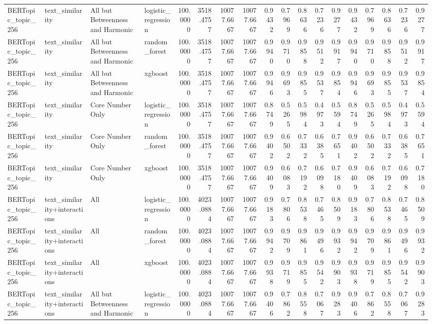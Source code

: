 \begin{tabular}{llllrrrrrrrrrrrrrr}
BERTopic_topic_256 & text_similarity & All but Betweenness and Harmonic & logistic_regression & 100.0000 & 3518.4757 & 10077.6667 & 10077.6667 & 0.9432 & 0.7969 & 0.8636 & 0.7236 & 0.9277 & 0.9432 & 0.7969 & 0.8636 & 0.7236 & 0.9277 \\
BERTopic_topic_256 & text_similarity & All but Betweenness and Harmonic & random_forest & 100.0000 & 3518.4757 & 10077.6667 & 10077.6667 & 0.9940 & 0.9710 & 0.9858 & 0.9512 & 0.9917 & 0.9940 & 0.9710 & 0.9858 & 0.9512 & 0.9917 \\
BERTopic_topic_256 & text_similarity & All but Betweenness and Harmonic & xgboost & 100.0000 & 3518.4757 & 10077.6667 & 10077.6667 & 0.9946 & 0.9693 & 0.9855 & 0.9537 & 0.9854 & 0.9946 & 0.9693 & 0.9855 & 0.9537 & 0.9854 \\
BERTopic_topic_256 & text_similarity & Core Number Only & logistic_regression & 100.0000 & 3518.4757 & 10077.6667 & 10077.6667 & 0.8749 & 0.5265 & 0.5984 & 0.4973 & 0.5594 & 0.8749 & 0.5265 & 0.5984 & 0.4973 & 0.5594 \\
BERTopic_topic_256 & text_similarity & Core Number Only & random_forest & 100.0000 & 3518.4757 & 10077.6667 & 10077.6667 & 0.9402 & 0.6502 & 0.7332 & 0.6385 & 0.7651 & 0.9402 & 0.6502 & 0.7332 & 0.6385 & 0.7651 \\
BERTopic_topic_256 & text_similarity & Core Number Only & xgboost & 100.0000 & 3518.4757 & 10077.6667 & 10077.6667 & 0.9409 & 0.6083 & 0.7192 & 0.6098 & 0.7180 & 0.9409 & 0.6083 & 0.7192 & 0.6098 & 0.7180 \\
BERTopic_topic_256 & text_similarity+interactions & All & logistic_regression & 100.0000 & 4023.0884 & 10077.6667 & 10077.6667 & 0.9183 & 0.7806 & 0.8538 & 0.7465 & 0.8509 & 0.9183 & 0.7806 & 0.8538 & 0.7465 & 0.8509 \\
BERTopic_topic_256 & text_similarity+interactions & All & random_forest & 100.0000 & 4023.0884 & 10077.6667 & 10077.6667 & 0.9942 & 0.9709 & 0.9861 & 0.9496 & 0.9932 & 0.9942 & 0.9709 & 0.9861 & 0.9496 & 0.9932 \\
BERTopic_topic_256 & text_similarity+interactions & All & xgboost & 100.0000 & 4023.0884 & 10077.6667 & 10077.6667 & 0.9938 & 0.9719 & 0.9855 & 0.9542 & 0.9903 & 0.9938 & 0.9719 & 0.9855 & 0.9542 & 0.9903 \\
BERTopic_topic_256 & text_similarity+interactions & All but Betweenness and Harmonic & logistic_regression & 100.0000 & 4023.0884 & 10077.6667 & 10077.6667 & 0.9406 & 0.7862 & 0.8558 & 0.7067 & 0.9283 & 0.9406 & 0.7862 & 0.8558 & 0.7067 & 0.9283 \\

\end{tabular}
